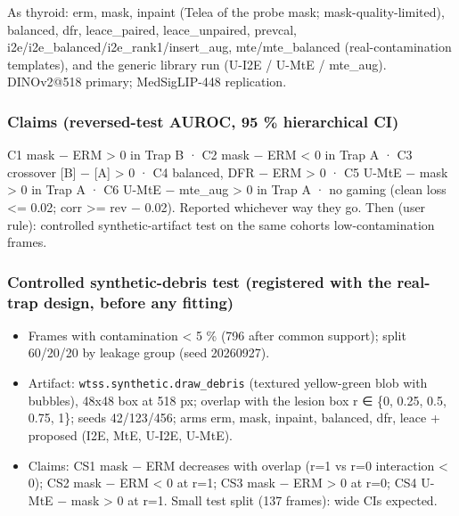{As thyroid: erm, mask, inpaint (Telea of the probe mask; mask-quality-limited), balanced, dfr, leace\_paired,
leace\_unpaired, prevcal, i2e/i2e\_balanced/i2e\_rank1/insert\_aug, mte/mte\_balanced (real-contamination templates),
and the generic library run (U-I2E / U-MtE / mte\_aug). DINOv2@518 primary; MedSigLIP-448 replication.

\subsubsection{Claims (reversed-test AUROC, 95 \% hierarchical CI)}\label{claims-reversed-test-auroc-95--hierarchical-ci}

C1 mask − ERM \textgreater{} 0 in Trap B · C2 mask − ERM \textless{} 0 in Trap A · C3 crossover {[}B{]} − {[}A{]} \textgreater{} 0 ·
C4 balanced, DFR − ERM \textgreater{} 0 · C5 U-MtE − mask \textgreater{} 0 in Trap A · C6 U-MtE − mte\_aug \textgreater{} 0 in Trap A ·
no gaming (clean loss \textless= 0.02; corr \textgreater= rev − 0.02). Reported whichever way they go.
Then (user rule): controlled synthetic-artifact test on the same cohort\textquotesingle s low-contamination frames.

\subsubsection{Controlled synthetic-debris test (registered with the real-trap design, before any fitting)}\label{controlled-synthetic-debris-test-registered-with-the-real-trap-design-before-any-fitting}

\begin{itemize}

\item
  Frames with contamination \textless{} 5 \% (796 after common support); split 60/20/20 by leakage group (seed 20260927).
\item
  Artifact: \texttt{wtss.synthetic.draw\_debris} (textured yellow-green blob with bubbles), 48x48 box at 518 px;
  overlap with the lesion box r ∈ \{0, 0.25, 0.5, 0.75, 1\}; seeds 42/123/456; arms erm, mask, inpaint, balanced,
  dfr, leace + proposed (I2E, MtE, U-I2E, U-MtE).
\item
  Claims: CS1 mask − ERM decreases with overlap (r=1 vs r=0 interaction \textless{} 0); CS2 mask − ERM \textless{} 0 at r=1;
  CS3 mask − ERM \textgreater{} 0 at r=0; CS4 U-MtE − mask \textgreater{} 0 at r=1. Small test split (137 frames): wide CIs expected.
\end{itemize}

}
